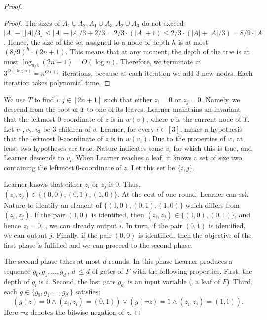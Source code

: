 \begin{proof}
\begin{proof}
The sizes of $A_1\cup A_2, A_1 \cup A_3, A_2 \cup A_3$ do not exceed $|A| - \lfloor |A|/3\rfloor \le |A| - |A|/3 + 2/3 = 2/3 \cdot(|A| + 1) \le 2/3 \cdot(|A| + |A|/3) = 8/9\cdot |A|$. Hence, the size of the set assigned to a node of depth $h$ is at most $\left(8/9\right)^h \cdot (2n + 1)$.  This means that at any moment, the depth of the tree is at most $\log_{9/8}(2n + 1) = O(\log n)$. Therefore, we terminate in $3^{O(\log n)} = n^{O(1)}$ iterations, because at each iteration we add $3$ new nodes. Each iteration takes polynomial time.  
\end{proof}

We use $T$ to find %
%
%
$i, j\in [2n + 1]$ such that either $z_i = 0$ or $z_j = 0$. Namely, we descend from the root of $T$ to one of its 
%
leaves.  %
Learner maintains an invariant that the leftmost $0$-coordinate of $z$ is in $w(v)$, where $v$ is the current node of $T$. Let $v_1, v_2, v_3$ be $3$ children of $v$. Learner, for every $i\in [3]$, makes a hypothesis that the leftmost $0$-coordinate of $z$ is in $w(v_i)$. Due to the properties of $w$, at least two hypotheses are true. Nature indicates some $v_i$ for which this is true, and Learner descends to $v_i$. When Learner reaches a leaf, it 
%
knows a set of size two containing the leftmost $0$-coordinate of $z$. 
Let this set be $\{i,j\}$. 





Learner knows that either $z_i$ or $z_j$ is $0$. Thus, $(z_i,z_j) \in\{(0,0), (0,1), (1,0)\}$. At the cost of one round,
%
Learner %
can ask Nature to identify an element of $\{(0,0), (0,1), (1,0)\}$ which differs from $(z_i,z_j)$. If the pair $(1,0)$ is identified, then $(z_i,z_j) \in \{(0,0), (0,1)\}$, and hence $z_i = 0$, \ie, we can already output $i$. In turn, if the pair $(0,1)$ is identified, we can output $j$. Finally, if the pair $(0,0)$ is identified, then the objective of the first phase is fulfilled and we can proceed to the second phase.

The second phase takes at most $d$ rounds. In this phase Learner produces a sequence $g_0, g_1, \ldots, g_{d^\prime}$, $d^\prime \le d$ of gates of $F$ with the following properties. First, the depth of $g_i$ is $i$. Second, the last gate $g_{d^\prime}$ is an input variable (\ie, a leaf of $F$). Third, each $g\in\{g_0, g_1, \ldots, g_{d^\prime}\}$ satisfies:
\begin{equation}
\label{maj_invariant}
\left(g(z) = 0 \land (z_i,z_j) = (0,1) \right) \lor \left( g(\lnot z)  = 1 \land (z_i,z_j) = (1,0)\right).
\end{equation}
Here $\lnot z$ denotes the %
bitwise  %
negation of $z$. 


\end{proof}
